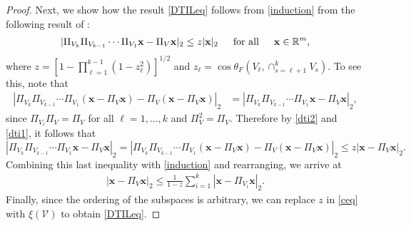 \documentclass[journal, onecolumn]{IEEEtran}
\begin{document}
\begin{proof}
Next, we show how the result \eqref{DTILeq} follows from \eqref{induction} from the following result of \cite[Theorem 9.33]{Deutsch}:
\begin{align}\label{dti2}
|\Pi_{V_k}\Pi_{V_{k-1}}\cdots\Pi_{V_1} \mathbf{x} - \Pi_V\mathbf{x}|_2 \leq z |\mathbf{x}|_2 \indent \text{for all} \indent \mathbf{x} \in \mathbb{R}^m,
\end{align}
where $z= \left[1 - \prod_{\ell =1}^{k-1}(1-z_{\ell}^2)\right]^{1/2}$ and $z_{\ell} = \cos\theta_F\left(V_{\ell}, \cap_{s=\ell+1}^k V_s\right)$. To see this, note that
\begin{align}\label{dti1}
|\Pi_{V_k}\Pi_{V_{k-1}}\cdots\Pi_{V_1}(\mathbf{x} - \Pi_V\mathbf{x}) - \Pi_V(\mathbf{x} - \Pi_V\mathbf{x})|_2 
&= |\Pi_{V_k}\Pi_{V_{k-1}}\cdots\Pi_{V_1} \mathbf{x} - \Pi_V \mathbf{x} |_2,
\end{align}
since $\Pi_{V_\ell} \Pi_V = \Pi_V$ for all $\ell = 1, \ldots, k$ and $\Pi_V^2 = \Pi_V$.
Therefore by \eqref{dti2} and \eqref{dti1}, it follows that
\[|\Pi_{V_k}\Pi_{V_{k-1}}\cdots\Pi_{V_1} \mathbf{x} - \Pi_V \mathbf{x} |_2
= |\Pi_{V_k}\Pi_{V_{k-1}}\cdots\Pi_{V_1}(\mathbf{x} - \Pi_V\mathbf{x}) - \Pi_V(\mathbf{x} - \Pi_V\mathbf{x})|_2  \leq z |\mathbf{x} - \Pi_V\mathbf{x}|_2.\]
Combining this last inequality with \eqref{induction} and rearranging, we arrive at
%
\begin{align}\label{ceq}
|\mathbf{x} - \Pi_V \mathbf{x}|_2 \leq \frac{1}{1 - z} \sum_{i=1}^k |\mathbf{x} - \Pi_{V_i} \mathbf{x}|_2.
\end{align}
Finally, since the ordering of the subspaces is arbitrary, we can replace $z$ in \eqref{ceq} with $\xi(\mathcal{V})$ to obtain \eqref{DTILeq}.
\end{proof}
\end{document}
